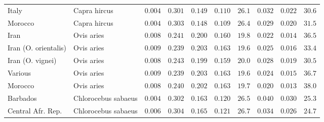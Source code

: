 \documentclass{article}
\begin{document}
\begin{center}
\begin{longtable*}{|l|l|r|r|r|r|r|r|r|r|}
            Italy &        Capra hircus &               $ 0.004$ &                $ 0.301$ &        $ 0.149$ &              $ 0.110$ &           $  26.1$ &                   $ 0.032$ &                         $ 0.022$ &                      $  30.6$ \\
            Morocco &        Capra hircus &               $ 0.004$ &                $ 0.303$ &        $ 0.148$ &              $ 0.109$ &           $  26.4$ &                   $ 0.029$ &                         $ 0.020$ &                      $  31.5$ \\
            Iran &          Ovis aries &               $ 0.008$ &                $ 0.241$ &        $ 0.200$ &              $ 0.160$ &           $  19.8$ &                   $ 0.022$ &                         $ 0.014$ &                      $  36.5$ \\
            Iran (O. orientalis) &          Ovis aries &               $ 0.009$ &                $ 0.239$ &        $ 0.203$ &              $ 0.163$ &           $  19.6$ &                   $ 0.025$ &                         $ 0.016$ &                      $  33.4$ \\
            Iran (O. vignei) &          Ovis aries &               $ 0.008$ &                $ 0.243$ &        $ 0.199$ &              $ 0.159$ &           $  20.0$ &                   $ 0.028$ &                         $ 0.019$ &                      $  30.5$ \\
            Various &          Ovis aries &               $ 0.009$ &                $ 0.239$ &        $ 0.203$ &              $ 0.163$ &           $  19.6$ &                   $ 0.024$ &                         $ 0.015$ &                      $  36.7$ \\
            Morocco &          Ovis aries &               $ 0.008$ &                $ 0.240$ &        $ 0.202$ &              $ 0.163$ &           $  19.7$ &                   $ 0.020$ &                         $ 0.013$ &                      $  38.0$ \\
            Barbados & Chlorocebus sabaeus &               $ 0.004$ &                $ 0.302$ &        $ 0.163$ &              $ 0.120$ &           $  26.5$ &                   $ 0.040$ &                         $ 0.030$ &                      $  25.3$ \\
            Central Afr. Rep. & Chlorocebus sabaeus &               $ 0.006$ &                $ 0.304$ &        $ 0.165$ &              $ 0.121$ &           $  26.7$ &                   $ 0.034$ &                         $ 0.026$ &                      $  24.7$ \\

\end{longtable*}
\end{center}
\end{document}
